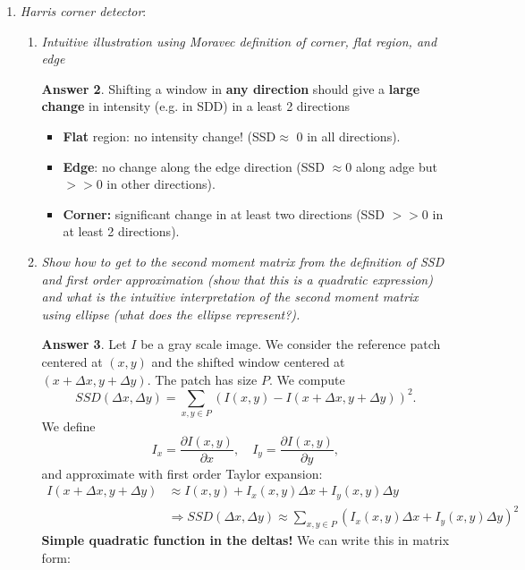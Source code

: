 \documentclass[a4paper,12 pt]{article}
\theoremstyle{definition}
\theoremstyle{remark}
\theoremstyle{definition}
\theoremstyle{definition}
\theoremstyle{definition}
\theoremstyle{definition}
\theoremstyle{remark}
\theoremstyle{remark}
\theoremstyle{definition}
\theoremstyle{definition}
\newtheorem*{answer}{Answer}
\begin{document}
\begin{enumerate}
\begin{answer}
\end{answer}
\item \textit{Harris corner detector}: 
\begin{enumerate}
\item \textit{Intuitive illustration using Moravec definition of corner, flat region, and edge}
\begin{answer}
Shifting a window in \textbf{any direction} should give a \textbf{large change} in intensity (e.g. in SDD) in a least 2 directions
\begin{itemize}
\item \textbf{Flat} region: no intensity change! (SSD$\approx$ 0 in all directions).
\item \textbf{Edge}: no change along the edge direction (SSD $\approx$0 along adge but $>>0$ in other directions).
\item \textbf{Corner:} significant change in at least two directions (SSD $>>0$ in at least 2 directions).
\end{itemize}
\end{answer}
\item \textit{Show how to get to the second moment matrix from the definition of SSD and first order approximation (show that this is a quadratic expression) and what is the intuitive interpretation of the second moment matrix using ellipse (what does the ellipse represent?). }
\begin{answer}
Let $I$ be a gray scale image. We consider the reference patch centered at $(x,y)$ and the shifted window centered at $(x+\Delta x,y+\Delta y)$. The patch has size $P$. We compute
\begin{equation}
SSD(\Delta x, \Delta y)=\sum_{x,y \in P}\left( I(x,y)-I(x+\Delta x,y+\Delta y)\right)^2.
\end{equation}
We define
\begin{equation}
I_x=\frac{\partial I(x,y)}{\partial x}, \quad I_y=\frac{\partial I(x,y)}{\partial y},
\end{equation}
and approximate with first order Taylor expansion:
\begin{equation}
\begin{split}
I(x+\Delta x,y+\Delta y) &\approx I(x,y)+I_x(x,y)\Delta x + I_y(x,y)\Delta y\\
&\Rightarrow SSD(\Delta x, \Delta y)\approx \sum_{x,y\in P}\left( I_x(x,y)\Delta x+I_y(x,y)\Delta y\right)^2
\end{split}
\end{equation}
\textbf{Simple quadratic function in the deltas!} We can write this in matrix form:

\end{answer}
\end{enumerate}
\end{enumerate}
\end{document}
